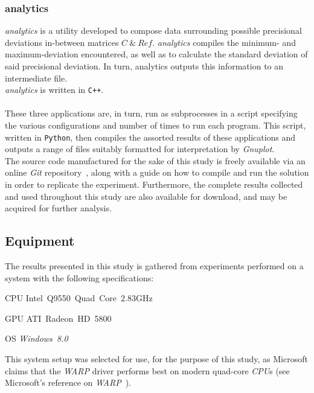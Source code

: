 \documentclass[a4paper,twocolumn,10pt]{article}
\begin{document}
\subsubsection{analytics}
\textit{analytics} is a utility developed to compose data surrounding possible precisional deviations in-between matrices $C~\&~Ref$. \textit{analytics} compiles the minimum- and maximum-deviation encountered, as well as to calculate the standard deviation of said precisional deviation. In turn, analytics outputs this information to an intermediate file.\\
\textit{analytics} is written in \texttt{C++}.\\
\\
These three applications are, in turn, run as subprocesses in a script specifying the various configurations and number of times to run each program. This script, written in \texttt{Python}, then compiles the assorted results of these applications and outputs a range of files suitably formatted for interpretation by \textit{Gnuplot}.\\
The source code manufactured for the sake of this study is freely available via an online \textit{Git} repository~, along with a guide on how to compile and run the solution in order to replicate the experiment. Furthermore, the complete results collected and used throughout this study are also available for download, and may be acquired for further analysis.

\subsection{Equipment}
\label{sec:contribution:equipment}
The results presented in this study is gathered from experiments performed on a system with the following specifications:
\begin{description*}
	\item[CPU]	Intel~Q9550~Quad~Core~$2.83$GHz
	\item[GPU]	ATI~Radeon~HD~5800
	\item[OS]	\tabto{0.35cm}\textit{Windows~8.0} %
\end{description*}
This system setup was selected for use, for the purpose of this study, as Microsoft claims that the \textit{WARP} driver performs best on modern quad-core \textit{CPU}s (see Microsoft's reference on \textit{WARP}~).

\end{document}
